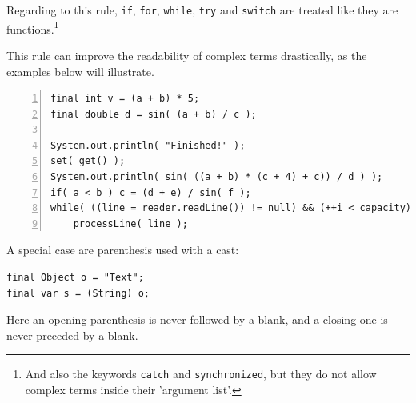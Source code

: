 \documentclass[11pt,a4paper, titlepage, parskip=half, headsepline, footsepline, cleardoublepage=current, headheight=1cm]{scrbook}
\begin{document}
Regarding to this rule, \lstinline|if|, \lstinline|for|, \lstinline|while|, \lstinline|try| and \lstinline|switch| are treated like they are functions.\footnote{And also the keywords \lstinline|catch| and \lstinline|synchronized|, but they do not allow complex terms inside their 'argument list'.}

This rule can improve the readability of complex terms drastically, as the examples below will illustrate.

\begin{lstlisting}[numbers=left]
final int v = (a + b) * 5;
final double d = sin( (a + b) / c );

System.out.println( "Finished!" );
set( get() );
System.out.println( sin( ((a + b) * (c + 4) + c)) / d ) );
if( a < b ) c = (d + e) / sin( f );
while( ((line = reader.readLine()) != null) && (++i < capacity) )
    processLine( line );
\end{lstlisting}

A special case are parenthesis used with a cast:
\begin{lstlisting}
final Object o = "Text";
final var s = (String) o;
\end{lstlisting}
Here an opening parenthesis is never followed by a blank, and a closing one is never preceded by a blank.
\end{document}
